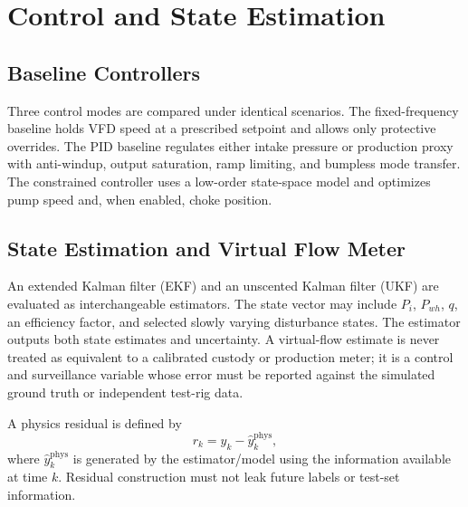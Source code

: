 \documentclass[conference]{IEEEtran}
\begin{document}
\section{Control and State Estimation}
\subsection{Baseline Controllers}
Three control modes are compared under identical scenarios. The fixed-frequency baseline holds VFD speed at a prescribed setpoint and allows only protective overrides. The PID baseline regulates either intake pressure or production proxy with anti-windup, output saturation, ramp limiting, and bumpless mode transfer. The constrained controller uses a low-order state-space model and optimizes pump speed and, when enabled, choke position.

\subsection{State Estimation and Virtual Flow Meter}
An extended Kalman filter (EKF) and an unscented Kalman filter (UKF) are evaluated as interchangeable estimators. The state vector may include $P_i$, $P_{wh}$, $q$, an efficiency factor, and selected slowly varying disturbance states. The estimator outputs both state estimates and uncertainty. A virtual-flow estimate is never treated as equivalent to a calibrated custody or production meter; it is a control and surveillance variable whose error must be reported against the simulated ground truth or independent test-rig data.

A physics residual is defined by
\begin{equation}
r_k=y_k-\hat y^{\mathrm{phys}}_k,
\label{eq:residual}
\end{equation}
where $\hat y^{\mathrm{phys}}_k$ is generated by the estimator/model using the information available at time $k$. Residual construction must not leak future labels or test-set information.
\end{document}
